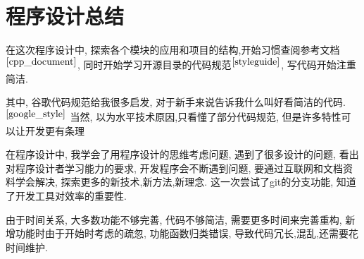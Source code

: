 \documentclass[UTF8]{ctexart}
\begin{document}
\section{程序设计总结}
  在这次程序设计中, 探索各个模块的应用和项目的结构,开始习惯查阅参考文档$^{\cite{cpp_document}}$, 同时开始学习开源目录的代码规范$^{\cite{styleguide}}$, 写代码开始注重简洁.

  其中, 谷歌代码规范给我很多启发, 对于新手来说告诉我什么叫好看简洁的代码.$^{\cite{google_style}}$
  当然, 以为水平技术原因,只看懂了部分代码规范, 但是许多特性可以让开发更有条理

  在程序设计中, 我学会了用程序设计的思维考虑问题, 遇到了很多设计的问题, 看出对程序设计者学习能力的要求, 开发程序会不断遇到问题, 要通过互联网和文档资料学会解决, 探索更多的新技术,新方法,新理念.
  这一次尝试了git的分支功能, 知道了开发工具对效率的重要性.

  由于时间关系, 大多数功能不够完善, 代码不够简洁, 需要更多时间来完善重构, 新增功能时由于开始时考虑的疏忽, 功能函数归类错误, 导致代码冗长,混乱,还需要花时间维护.


\nocite{cpp_primier}%
\end{document}

